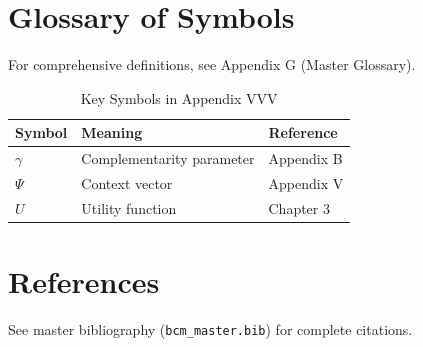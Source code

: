 \section{Glossary of Symbols}
\label{sec:vvv-glossary}

For comprehensive definitions, see Appendix G (Master Glossary).

\begin{table}[htbp]
\centering
\caption{Key Symbols in Appendix VVV}
\begin{tabular}{lll}
\toprule
\textbf{Symbol} & \textbf{Meaning} & \textbf{Reference} \\
\midrule
$\gamma$ & Complementarity parameter & Appendix B \\
$\Psi$ & Context vector & Appendix V \\
$U$ & Utility function & Chapter 3 \\
\bottomrule
\end{tabular}
\end{table}


\section{References}
\label{sec:vvv-references}

See master bibliography (\texttt{bcm\_master.bib}) for complete citations.

\nocite{bcm_master}

